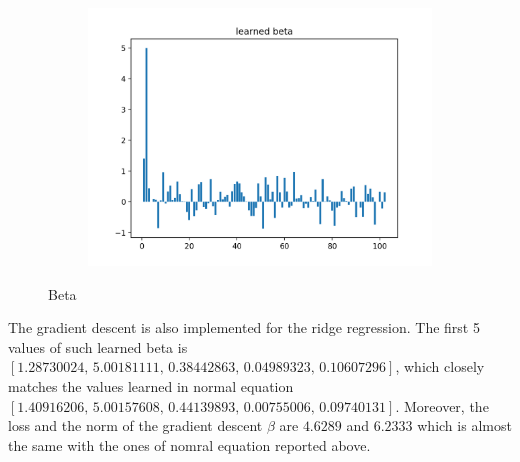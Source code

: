 \documentclass[11pt]{article}
\begin{document}
\begin{enumerate}
\begin{figure}[!h]
  \centering
  \begin{subfigure}[b]{0.4\linewidth}
    \includegraphics[width=\linewidth]{figures/beta.png}
  \end{subfigure}
  \caption{Beta}
  \label{fig:beta}
\end{figure}

\medskip

The gradient descent is also implemented for the ridge regression. The first 5 values of such learned beta is $[1.28730024,\, 5.00181111,\, 0.38442863,\, 0.04989323,\, 0.10607296]$, which closely matches the values learned in normal equation $[1.40916206,\, 5.00157608,\, 0.44139893,\, 0.00755006,\, 0.09740131]$. Moreover, the loss and the norm of the gradient descent $\beta$ are $4.6289$ and $6.2333$ which is almost the same with the ones of nomral equation reported above.

\end{enumerate}
\end{document}
